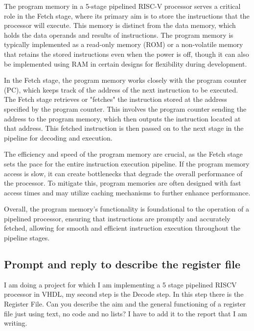 \documentclass{article}
\begin{document}
\begin{spverbatim}
The program memory in a 5-stage pipelined RISC-V 
processor serves a critical role in the Fetch stage, 
where its primary aim is to store the instructions that the processor will execute. 
This memory is distinct from the data memory, 
which holds the data operands and results of instructions. 
The program memory is typically implemented as a read-only memory (ROM) 
or a non-volatile memory that retains 
the stored instructions even when the power is off,
though it can also be implemented using RAM 
in certain designs for flexibility during development.

In the Fetch stage, the program memory 
works closely with the program counter (PC), 
which keeps track of the address of the next instruction to be executed. 
The Fetch stage retrieves or "fetches" the instruction stored 
at the address specified by the program counter. 
This involves the program counter sending the address to the program memory, 
which then outputs the instruction located at that address. 
This fetched instruction is then passed on to the next stage 
in the pipeline for decoding and execution.

The efficiency and speed of the program memory are crucial, 
as the Fetch stage sets the pace for the entire instruction execution pipeline. 
If the program memory access is slow, it can create bottlenecks 
that degrade the overall performance of the processor. 
To mitigate this, program memories are often designed with fast access times and 
may utilize caching mechanisms to further enhance performance.

Overall, the program memory's functionality is foundational 
to the operation of a pipelined processor, 
ensuring that instructions are promptly and accurately fetched, 
allowing for smooth and efficient instruction 
execution throughout the pipeline stages.
\end{spverbatim}


\subsection{Prompt and reply to describe the register file}\label{prompt:regfile}
\begin{itshape}
I am doing a project for which I am implementing a 5 stage pipelined RISCV processor in VHDL, 
my second step is the Decode step. In this step there is the Register File. Can you describe the aim and
the general functioning of a register file just using text, no code and no lists? I have to add it to
the report that I am writing.
\end{itshape}
\end{document}
